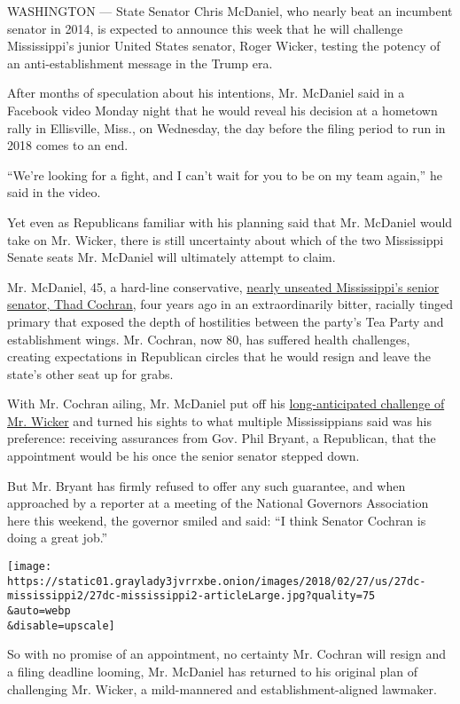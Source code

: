 WASHINGTON --- State Senator Chris McDaniel, who nearly beat an
incumbent senator in 2014, is expected to announce this week that he
will challenge Mississippi's junior United States senator, Roger Wicker,
testing the potency of an anti-establishment message in the Trump era.

After months of speculation about his intentions, Mr. McDaniel said in a
Facebook video Monday night that he would reveal his decision at a
hometown rally in Ellisville, Miss., on Wednesday, the day before the
filing period to run in 2018 comes to an end.

``We're looking for a fight, and I can't wait for you to be on my team
again,'' he said in the video.

Yet even as Republicans familiar with his planning said that Mr.
McDaniel would take on Mr. Wicker, there is still uncertainty about
which of the two Mississippi Senate seats Mr. McDaniel will ultimately
attempt to claim.

Mr. McDaniel, 45, a hard-line conservative,
\href{https://www.nytimes3xbfgragh.onion/2014/06/25/us/politics/thad-cochran-chris-mcdaniel-mississippi-senate-primary.html}{nearly
unseated Mississippi's senior senator, Thad Cochran}, four years ago in
an extraordinarily bitter, racially tinged primary that exposed the
depth of hostilities between the party's Tea Party and establishment
wings. Mr. Cochran, now 80, has suffered health challenges, creating
expectations in Republican circles that he would resign and leave the
state's other seat up for grabs.

With Mr. Cochran ailing, Mr. McDaniel put off his
\href{https://www.nytimes3xbfgragh.onion/2017/10/21/us/politics/mcdaniel-wicker-mississippi-senate-race-bannon.html}{long-anticipated
challenge of Mr. Wicker} and turned his sights to what multiple
Mississippians said was his preference: receiving assurances from Gov.
Phil Bryant, a Republican, that the appointment would be his once the
senior senator stepped down.

But Mr. Bryant has firmly refused to offer any such guarantee, and when
approached by a reporter at a meeting of the National Governors
Association here this weekend, the governor smiled and said: ``I think
Senator Cochran is doing a great job.''

\texttt{[image: https://static01.graylady3jvrrxbe.onion/images/2018/02/27/us/27dc-mississippi2/27dc-mississippi2-articleLarge.jpg?quality=75\\\&auto=webp\\\&disable=upscale]}

So with no promise of an appointment, no certainty Mr. Cochran will
resign and a filing deadline looming, Mr. McDaniel has returned to his
original plan of challenging Mr. Wicker, a mild-mannered and
establishment-aligned lawmaker.

